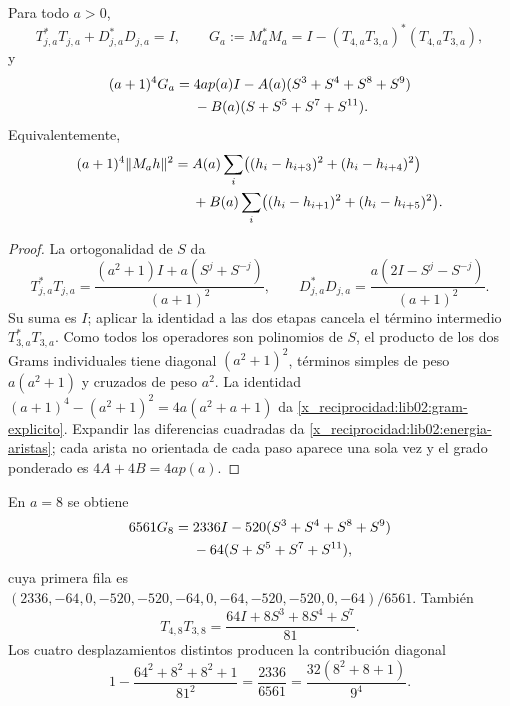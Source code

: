 \begin{proposition}
\label{x_reciprocidad:lib02:gram}
Para todo \(a>0\),
\[
 T_{j,a}^*T_{j,a}+D_{j,a}^*D_{j,a}=I,\qquad
 G_a:=M_a^*M_a=I-(T_{4,a}T_{3,a})^*(T_{4,a}T_{3,a}),
\]
y
\begin{align}
 (a+1)^4G_a={}&4ap(a)I
 -A(a)(S^3+S^4+S^8+S^9)\notag\\
 &-B(a)(S+S^5+S^7+S^{11}).
 \label{x_reciprocidad:lib02:gram-explicito}
\end{align}
Equivalentemente,
\begin{align}
 (a+1)^4\|M_ah\|^2={}&A(a)\sum_i
 \bigl((h_i-h_{i+3})^2+(h_i-h_{i+4})^2\bigr)\notag\\
 &+B(a)\sum_i
 \bigl((h_i-h_{i+1})^2+(h_i-h_{i+5})^2\bigr).
 \label{x_reciprocidad:lib02:energia-aristas}
\end{align}
\end{proposition}
\begin{proof}
La ortogonalidad de \(S\) da
\[
 T_{j,a}^*T_{j,a}
 =\frac{(a^2+1)I+a(S^j+S^{-j})}{(a+1)^2},\qquad
 D_{j,a}^*D_{j,a}
 =\frac{a(2I-S^j-S^{-j})}{(a+1)^2}.
\]
Su suma es \(I\); aplicar la identidad a las dos etapas cancela el
término intermedio \(T_{3,a}^*T_{3,a}\). Como todos los operadores
son polinomios de \(S\), el producto de los dos Grams individuales
tiene diagonal \((a^2+1)^2\), términos simples de peso
\(a(a^2+1)\) y cruzados de peso \(a^2\). La identidad
\((a+1)^4-(a^2+1)^2=4a(a^2+a+1)\) da
\eqref{x_reciprocidad:lib02:gram-explicito}. Expandir las diferencias cuadradas da
\eqref{x_reciprocidad:lib02:energia-aristas}; cada arista no orientada de cada paso
aparece una sola vez y el grado ponderado es \(4A+4B=4ap(a)\).
\end{proof}

En \(a=8\) se obtiene
\begin{align}
 6561G_8={}&2336I-520(S^3+S^4+S^8+S^9)\notag\\
 &-64(S+S^5+S^7+S^{11}),
 \label{x_reciprocidad:lib02:gram-nonadico}
\end{align}
cuya primera fila es
\((2336,-64,0,-520,-520,-64,0,-64,-520,-520,0,-64)/6561\).
También
\[
 T_{4,8}T_{3,8}=\frac{64I+8S^3+8S^4+S^7}{81}.
\]
Los cuatro desplazamientos distintos producen la contribución diagonal
\[
 1-\frac{64^2+8^2+8^2+1}{81^2}
 =\frac{2336}{6561}
 =\frac{32(8^2+8+1)}{9^4}.
\]


